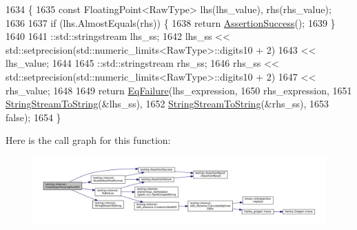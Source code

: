 \begin{DoxyCode}
1634                                                             \{
1635   \textcolor{keyword}{const} FloatingPoint<RawType> lhs(lhs\_value), rhs(rhs\_value);
1636 
1637   \textcolor{keywordflow}{if} (lhs.AlmostEquals(rhs)) \{
1638     \textcolor{keywordflow}{return} \hyperlink{namespacetesting_ac1d0baedb17286c5c6c87bd1a45da8ac}{AssertionSuccess}();
1639   \}
1640 
1641   ::std::stringstream lhs\_ss;
1642   lhs\_ss << std::setprecision(std::numeric\_limits<RawType>::digits10 + 2)
1643          << lhs\_value;
1644 
1645   ::std::stringstream rhs\_ss;
1646   rhs\_ss << std::setprecision(std::numeric\_limits<RawType>::digits10 + 2)
1647          << rhs\_value;
1648 
1649   \textcolor{keywordflow}{return} \hyperlink{namespacetesting_1_1internal_a08725846ff184d3e79bcf5be4df19157}{EqFailure}(lhs\_expression,
1650                    rhs\_expression,
1651                    \hyperlink{namespacetesting_1_1internal_ac0a2b7f69fc829d80a39e925b6417e39}{StringStreamToString}(&lhs\_ss),
1652                    \hyperlink{namespacetesting_1_1internal_ac0a2b7f69fc829d80a39e925b6417e39}{StringStreamToString}(&rhs\_ss),
1653                    \textcolor{keyword}{false});
1654 \}
\end{DoxyCode}
Here is the call graph for this function\+:
\nopagebreak
\begin{figure}[H]
\begin{center}
\leavevmode
\includegraphics[width=350pt]{namespacetesting_1_1internal_a98ce463e5dbe0c6120fa817e1f8f2944_cgraph}
\end{center}
\end{figure}
\mbox{\label{namespacetesting_1_1internal_a894ffccd936d78fd555f490020c27f0a}} 

